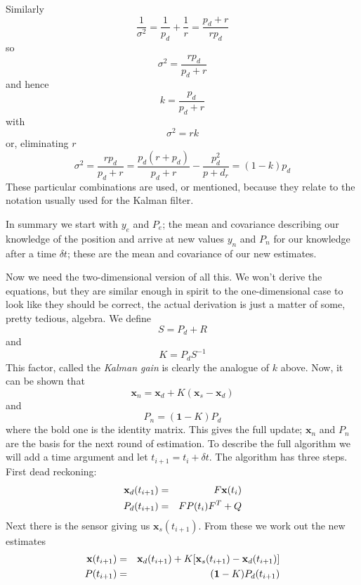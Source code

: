 \documentclass[12pt]{article}
\begin{document}
Similarly
\begin{equation}
\frac{1}{\sigma^2}=\frac{1}{p_d}+\frac{1}{r}=\frac{p_d+r}{rp_d}
\end{equation}
so 
\begin{equation}
\sigma^2=\frac{rp_d}{p_d+r}
\end{equation}
and hence
\begin{equation}
k=\frac{p_d}{p_d+r}
\end{equation}
with
\begin{equation}
\sigma^2=rk
\end{equation}
or, eliminating $r$
\begin{equation}
\sigma^2=\frac{rp_d}{p_d+r}=\frac{p_d(r+p_d)}{p_d+r}-\frac{p_d^2}{p+d_r}=(1-k)p_d
\end{equation}
These particular combinations are used, or mentioned, because they
relate to the notation usually used for the Kalman filter.

In summary we start with $y_e$ and $P_e$; the mean and covariance
describing our knowledge of the position and arrive at new values
$y_n$ and $P_n$ for our knowledge after a time $\delta t$; these are
the mean and covariance of our new estimates.

Now we need the two-dimensional version of all this. We won't derive
the equations, but they are similar enough in spirit to the
one-dimensional case to look like they should be correct, the actual
derivation is just a matter of some, pretty tedious, algebra. We define
\begin{equation}
S=P_d+R
\end{equation}
and
\begin{equation}
K=P_dS^{-1}
\end{equation}
This factor, called the \textsl{Kalman gain} is clearly the analogue of $k$ above. Now, it can be shown that
\begin{equation}
\mathbf{x}_n=\mathbf{x}_d+K(\mathbf{x}_s-\mathbf{x}_d)
\end{equation}
and 
\begin{equation}
P_n=(\textbf{1}-K)P_d
\end{equation}
where the bold one is the identity matrix. This gives the full update;
$\mathbf{x}_n$ and $P_n$ are the basis for the next round of
estimation. To describe the full algorithm we will add a time argument
and let $t_{i+1}=t_i+\delta t$. The algorithm has three steps. First
dead reckoning:
\begin{eqnarray}
\textbf{x}_d(t_{i+1})&=&F\textbf{x}(t_i)\cr
P_d(t_{i+1})&=&FP(t_i)F^{T}+Q
\end{eqnarray}
Next there is the sensor giving us $\mathbf{x}_s(t_{i+1})$. From these we work out the new estimates
\begin{eqnarray}
\textbf{x}(t_{i+1})&=&\mathbf{x}_d(t_{i+1})+K[\mathbf{x}_s(t_{i+1})-\mathbf{x}_d(t_{i+1})]\cr
P(t_{i+1})&=&(\textbf{1}-K)P_d(t_{i+1})
\end{eqnarray}
\end{document}
